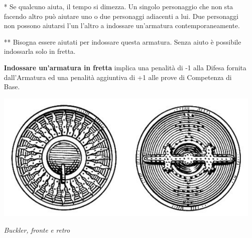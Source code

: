 \bigskip

\begin{multicols}{2}

{*} Se qualcuno aiuta, il tempo si dimezza. Un singolo personaggio che non sta facendo altro può aiutare uno o due personaggi adiacenti a lui. Due personaggi non possono aiutarsi l'un l'altro a indossare un'armatura contemporaneamente.

{*}{*} Bisogna essere aiutati per indossare questa armatura. Senza aiuto è possibile indossarla solo in fretta.

\textbf{Indossare un'armatura in fretta} implica una penalità di -1 alla Difesa fornita dall'Armatura ed una penalità aggiuntiva di +1 alle prove di Competenza di Base.

\end{multicols}




\vfill
\begin{center}
	\includegraphics[width=0.65\linewidth]{immagini/buckler.png}

	\emph{Buckler, fronte e retro}
\end{center}


\pagebreak

